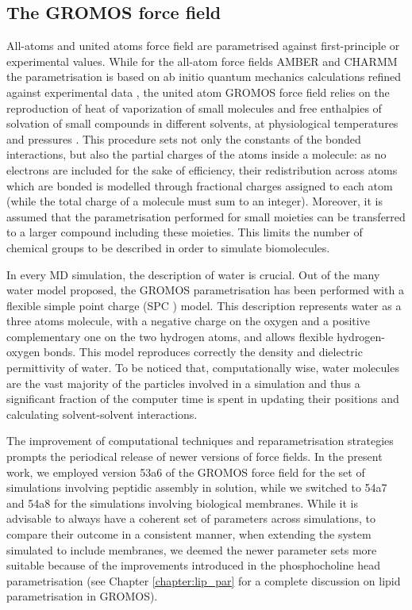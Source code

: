 \subsection{The GROMOS force field}
All-atoms and united atoms force field are parametrised against first-principle or experimental values.
%
While for the all-atom force fields AMBER and CHARMM the parametrisation is based on ab initio quantum mechanics calculations refined against experimental data \cite{Maier2015,Dickson2014,Wang2004_amber,MacKerell1998,Klauda2010}, the united atom GROMOS force field relies on the reproduction of heat of vaporization of small molecules and free enthalpies of solvation of small compounds in different solvents, at physiological temperatures and pressures \cite{Oostenbrink2005,Schmid2011,Reif2013}.
%
This procedure sets not only the constants of the bonded interactions, but also the partial charges of the atoms inside a molecule: as no electrons are included for the sake of efficiency, their redistribution across atoms which are bonded is modelled through fractional charges assigned to each atom (while the total charge of a molecule must sum to an integer).
%
Moreover, it is assumed that the parametrisation performed for small moieties can be transferred to a larger compound including these moieties. This limits the number of chemical groups to be described in order to simulate biomolecules.

In every MD simulation, the description of water is crucial. Out of the many water model proposed, the GROMOS parametrisation has been performed with a flexible simple point charge (SPC \cite{Berendsen1981}) model. This description represents water as a three atoms molecule, with a negative charge on the oxygen and a positive complementary one on the two hydrogen atoms, and allows flexible hydrogen-oxygen bonds. This model reproduces correctly the density and dielectric permittivity of water. To be noticed that, computationally wise, water molecules are the vast majority of the particles involved in a simulation and thus a significant fraction of the computer time is spent in updating their positions and calculating solvent-solvent interactions.

The improvement of computational techniques and reparametrisation strategies prompts the periodical release of newer versions of force fields. In the present work, we employed version 53a6 of the GROMOS force field \cite{Oostenbrink2004} for the set of simulations involving peptidic assembly in solution, while we switched to 54a7 \cite{Schmid2011} and 54a8 \cite{Reif2013} for the simulations involving biological membranes. While it is advisable to always have a coherent set of parameters across simulations, to compare their outcome in a consistent manner, when extending the system simulated to include membranes, we deemed the newer parameter sets more suitable because of the improvements introduced in the phosphocholine head parametrisation (see Chapter \ref{chapter:lip_par} for a complete discussion on lipid parametrisation in GROMOS).


